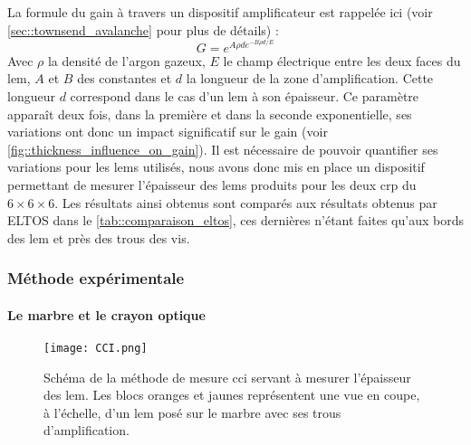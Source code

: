                 La formule du gain à travers un dispositif amplificateur est rappelée ici (voir \autoref{sec::townsend_avalanche} pour plus de détails) :
                \begin{equation}\label{eq::townsend_avalanche_2}
                    G = e^{A\rho d e^{-B\rho d/E}}
                \end{equation}
                Avec $\rho$ la densité de l'argon gazeux, $E$ le champ électrique entre les deux faces du \gls{lem}, $A$ et $B$ des constantes et $d$ la longueur de la zone d'amplification. Cette longueur $d$ correspond dans le cas d'un \gls{lem} à son épaisseur. Ce paramètre apparaît deux fois, dans la première et dans la seconde exponentielle, ses variations ont donc un impact significatif sur le gain (voir \autoref{fig::thickness_influence_on_gain}). Il est nécessaire de pouvoir quantifier ses variations pour les \glspl{lem} utilisés, nous avons donc mis en place un dispositif permettant de mesurer l'épaisseur des \glspl{lem} produits pour les deux \gls{crp} du $6\times6\times6$. Les résultats ainsi obtenus sont comparés aux résultats obtenus par ELTOS dans le \autoref{tab::comparaison_eltos}, ces dernières n'étant faites qu'aux bords des \gls{lem} et près des trous des vis.
                
            \subsubsection{Méthode expérimentale}
                \paragraph{Le marbre et le crayon optique}
                
                    \begin{wrapfigure}{r}{0.4\textwidth}
                        \texttt{[image: CCI.png]}
                        \caption[Schéma de la méthode de mesure \gls{cci}.]{Schéma de la méthode de mesure \gls{cci} servant à mesurer l'épaisseur des \gls{lem}. Les blocs oranges et jaunes représentent une vue en coupe, à l'échelle, d'un \gls{lem} posé sur le marbre avec ses trous d'amplification.}
                        \label{fig::CCI}
                    \end{wrapfigure}
                    
